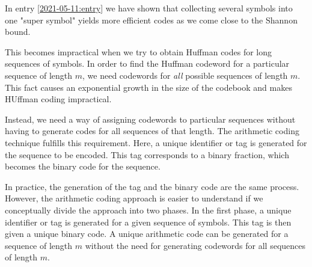 
In entry \ref{2021-05-11:entry} we have shown that collecting several symbols into one "super symbol" yields more efficient codes as we come close to the Shannon bound. 

This becomes impractical when we try to obtain Huffman codes for long sequences of symbols. In order to find the Huffman codeword for a particular sequence of length $m$, we need codewords for \emph{all} possible sequences of length $m$. This fact causes an exponential growth in the size of the codebook and makes HUffman coding impractical.

Instead, we need a way of assigning codewords to particular sequences without having to generate codes for all sequences of that length. The arithmetic coding technique fulfills this requirement. Here, a unique identifier or tag is generated for the sequence to be encoded. This tag corresponds to a binary fraction, which becomes the binary code for the sequence.

In practice, the generation of the tag and the binary code are the same process. However, the arithmetic coding approach is easier to understand if we conceptually divide the approach into two phases. In the first phase, a unique identifier or tag is generated for a given sequence of symbols. This tag is then given a unique binary code. A unique arithmetic code can be generated for a sequence of length $m$ without the need for generating codewords for all sequences of length $m$.



